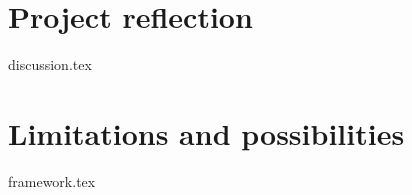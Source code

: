 
\section{Project reflection}\label{sec:whatif:discussion}
    {{discussion.tex}}


\section{Limitations and possibilities}\label{sec:whatif:framework}
    {{framework.tex}}





    
